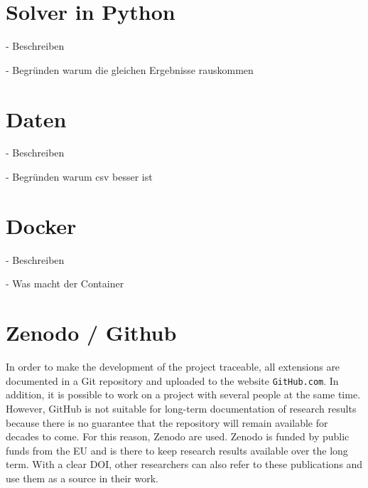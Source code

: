 \documentclass{article}
\begin{document}
\begin{multicols}{2}

\section{Solver in Python}
- Beschreiben

- Begründen warum die gleichen Ergebnisse rauskommen

\section{Daten}
- Beschreiben 

- Begründen warum csv besser ist 

\section{Docker}
- Beschreiben

- Was macht der Container

\section{Zenodo / Github}
In order to make the development of the project traceable, all extensions are documented in a Git repository and uploaded to the website \texttt{GitHub.com}. In addition, it is possible to work on a project with several people at the same time. However, GitHub is not suitable for long-term documentation of research results because there is no guarantee that the repository will remain available for decades to come. For this reason, Zenodo are used.
Zenodo is funded by public funds from the EU and is there to keep research results available over the long term. With a clear DOI, other researchers can also refer to these publications and use them as a source in their work.

\end{multicols}
\end{document}
